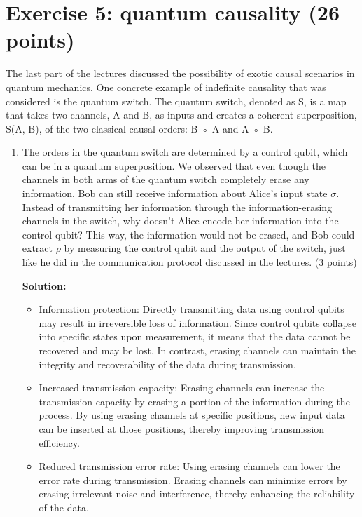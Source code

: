 \documentclass[12pt]{article}
\begin{document}
\section{Exercise 5: quantum causality (26 points)}
The last part of the lectures discussed the possibility of exotic causal scenarios in quantum mechanics. One concrete example of indefinite causality that was considered is the quantum switch. The quantum switch, denoted as S, is a map that takes two channels, A and B, as inputs and creates a coherent superposition, S(A, B), of the two classical causal orders: B ◦ A and A ◦ B.

\begin{enumerate}
    \item The orders in the quantum switch are determined by a control qubit, which can be in a quantum superposition.
    We observed that even though the channels in both arms of the quantum switch completely erase any information, Bob can still receive information about Alice's input state $\sigma$. Instead of transmitting her information through the information-erasing channels in the switch, why doesn't Alice encode her information into the control qubit? This way, the information would not be erased, and Bob could extract $\rho$ by measuring the control qubit and the output of the switch, just like he did in the communication protocol discussed in the lectures. (3 points)
    
    \textbf{Solution:}
    
    \begin{itemize}
        \item Information protection: Directly transmitting data using control qubits may result in irreversible loss of information. Since control qubits collapse into specific states upon measurement, it means that the data cannot be recovered and may be lost. In contrast, erasing channels can maintain the integrity and recoverability of the data during transmission.
        \item Increased transmission capacity: Erasing channels can increase the transmission capacity by erasing a portion of the information during the process. By using erasing channels at specific positions, new input data can be inserted at those positions, thereby improving transmission efficiency.
        \item Reduced transmission error rate: Using erasing channels can lower the error rate during transmission. Erasing channels can minimize errors by erasing irrelevant noise and interference, thereby enhancing the reliability of the data.
    \end{itemize}


\end{enumerate}
\end{document}

